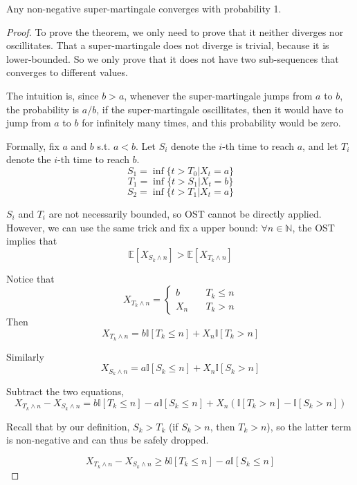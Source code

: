    \begin{theorem}\label{Thm:ConvergenceOfSuperMartingale}
        Any non-negative super-martingale converges with probability 1.
    \end{theorem}
    \begin{proof}
        To prove the theorem, we only need to prove that it neither diverges nor oscillitates. That a super-martingale does not diverge is trivial, because it is lower-bounded. So we only prove that it does not have two sub-sequences that converges to different values.

        The intuition is, since $b > a$, whenever the super-martingale jumps from $a$ to $b$, the probability is $a/b$, if the super-martingale oscillitates, then it would have to jump from $a$ to $b$ for infinitely many times, and this probability would be zero.

        Formally, fix $a$ and $b$ s.t. $a < b$. Let $S_i$ denote the $i$-th time to reach $a$, and let $T_i$ denote the $i$-th time to reach $b$.
        \[ S_1 = \inf\{ t > T_0 | X_t = a \} \]
        \[ T_1 = \inf\{ t > S_1 | X_t = b \} \]
        \[ S_2 = \inf\{ t > T_1 | X_t = a \} \]
        
        $S_i$ and $T_i$ are not necessarily bounded, so OST cannot be directly applied. However, we can use the same trick and fix a upper bound: $\forall n \in \mathbb{N}$, the OST implies that
        \[ \mathbb{E}[X_{S_k \wedge n}] > \mathbb{E}[X_{T_k \wedge n}] \]

        Notice that
        \[ X_{T_k \wedge n} = \begin{cases}
            b &\quad T_k \le n\\
            X_n &\quad T_k > n
        \end{cases} \]
        Then
        \[ X_{T_k \wedge n} = b\mathbb{I}[T_k \le n] + X_n\mathbb{I}[T_k > n] \]

        Similarly
        \[ X_{S_k \wedge n} = a\mathbb{I}[S_k \le n] + X_n \mathbb{I}[S_k > n] \]

        Subtract the two equations,
        \[ X_{T_k \wedge n} - X_{S_k \wedge n} = b\mathbb{I}[T_k \le n] - a\mathbb{I}[S_k \le n] + X_n \left( \mathbb{I}[T_k > n] - \mathbb{I}[S_k > n] \right) \]

        Recall that by our definition, $S_k > T_k$ (if $S_k > n$, then $T_k >n$), so the latter term is non-negative and can thus be safely dropped.

        \[ X_{T_k \wedge n} - X_{S_k \wedge n} \ge b\mathbb{I}[T_k \le n] - a\mathbb{I}[S_k \le n]  \]


\end{proof}
